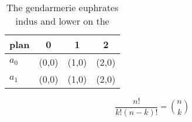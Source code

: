 \documentclass[a4paper]{article}
\begin{document}
\begin{table}
\begin{adjustbox}{width=0.6\columnwidth}
\begin{tabular}{|l|l|l|l|}
\hline
\textbf{plan} & \multicolumn{1}{c|}{\textbf{0}} & \multicolumn{1}{c|}{\textbf{1}} & \multicolumn{1}{c|}{\textbf{2}} \\ \hline
\textbf{$a_0$}  & (0,0) & (1,0) & (2,0) \\ \hline
\textbf{$a_1$}  & (0,0) & (1,0) & (2,0) \\ \hline
\end{tabular}
\end{adjustbox}
\caption{The gendarmerie euphrates indus and lower on the 
}
\end{table}

\[ \frac{n!}{k!(n-k)!} = \binom{n}{k} \]
\end{document}
